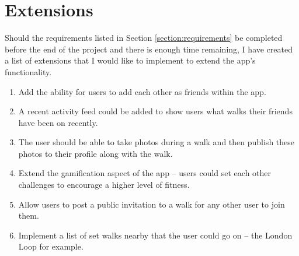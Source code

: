 \section{Extensions}

Should the requirements listed in Section \ref{section:requirements} be completed before the end of the project and there is enough time remaining, I have created a list of extensions that I would like to implement to extend the app's functionality.

\begin{enumerate}[label=\textbf{Ext \arabic*}]
  \item Add the ability for users to add each other as friends within the app.
  \item A recent activity feed could be added to show users what walks their friends have been on recently.
  \item The user should be able to take photos during a walk and then publish these photos to their profile along with the walk.
  \item Extend the gamification aspect of the app -- users could set each other challenges to encourage a higher level of fitness.
  \item Allow users to post a public invitation to a walk for any other user to join them.
  \item Implement a list of set walks nearby that the user could go on -- the London Loop for example.
\end{enumerate}